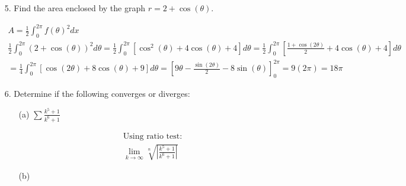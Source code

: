 \begin{itemize}
        \item [5.] Find the area enclosed by the graph $r=2+\cos(\theta)$.
        \\
        \begin{mdframed}
            \begin{equation*}
                \begin{gathered}
                    A = \frac{1}{2}\int_{0}^{2\pi}f(\theta)^{2}dx \\
                    \frac{1}{2}\int_{0}^{2\pi}(2+\cos(\theta))^{2}d\theta =
                    \frac{1}{2}\int_{0}^{2\pi}\left[\cos^{2}(\theta)+4\cos(\theta)+4\right]d\theta =
                    \frac{1}{2}\int_{0}^{2\pi}\left[\frac{1+\cos(2\theta)}{2}+4\cos(\theta)+4\right]d\theta  \\
                    = \frac{1}{4}\int_{0}^{2\pi}\left[\cos(2\theta)+8\cos(\theta)+9\right]d\theta =
                    \left[
                        9\theta-\frac{\sin(2\theta)}{2}-8\sin(\theta)
                    \right]_{0}^{2\pi} =
                    9(2\pi) = \boxed{18\pi}
                \end{gathered}
            \end{equation*}
        \end{mdframed}

        \item [6.] Determine if the following converges or diverges:
    
            \begin{itemize}
                \item [(a)] $\sum\frac{k^{5}+1}{k^{6}+1}$
                \\
                \begin{mdframed}
                    \begin{equation*}
                        \begin{gathered}
                            \text{Using ratio test: }   \\
                            \lim_{k \to \infty}\sqrt[n]{\left|\frac{k^{5}+1}{k^{6}+1}\right|}
                        \end{gathered}
                    \end{equation*}
                \end{mdframed}

                \item [(b)]
            \end{itemize}
    \end{itemize}
